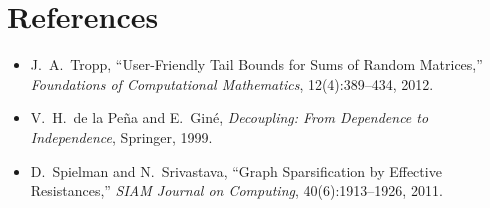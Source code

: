 \documentclass[12pt]{article}
\theoremstyle{definition}
\theoremstyle{remark}
\begin{document}
\section*{References}

\begin{itemize}
  \item J.~A.~Tropp, ``User-Friendly Tail Bounds for Sums of Random Matrices,'' \emph{Foundations of Computational Mathematics}, 12(4):389--434, 2012.
  \item V.~H.~de la Pe\~{n}a and E.~Gin\'{e}, \emph{Decoupling: From Dependence to Independence}, Springer, 1999.
  \item D.~Spielman and N.~Srivastava, ``Graph Sparsification by Effective Resistances,'' \emph{SIAM Journal on Computing}, 40(6):1913--1926, 2011.
\end{itemize}
\end{document}
